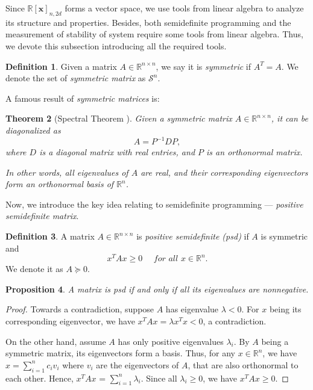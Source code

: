 \documentclass[12pt]{amsart}
\numberwithin{equation}{section}
\newtheorem{thm}{Theorem}
\newtheorem{prop}[thm]{Proposition}
\theoremstyle{definition}
\newtheorem{definition}[thm]{Definition}
\numberwithin{thm}{section}
\begin{document}
Since $\mathbb{R}[\mathbf{x}]_{n, 2d}$ forms a vector space, we use tools from linear algebra 
to analyze its structure and properties.
Besides, both semidefinite programming and the measurement of stability of system require some tools from linear algebra. 
Thus, we devote this subsection introducing all the required tools. 

\begin{definition}
     Given a matrix $A \in \mathbb{R}^{n \times n}$, we say it is \emph{symmetric} if $A^T = A$. We denote the set of \emph{symmetric matrix} as $\mathcal{S}^n$.  
\end{definition}

A famous result of \emph{symmetric matrices} is:
\begin{thm} [Spectral Theorem \cite{golub1996matrix}]

     Given a symmetric matrix $A \in \mathbb{R}^{n \times n}$, 
     it can be diagonalized as \begin{equation*} A = P^{-1}DP, \end{equation*}
     where $D$ is a diagonal matrix with real entries, and $P$ is an orthonormal matrix.
     
     In other words, all eigenvalues of $A$ are real, and their corresponding eigenvectors form an orthonormal basis of $\mathbb{R}^n$. 
\end{thm} 

\smallskip

Now, we introduce the key idea relating to semidefinite programming --- \emph{positive semidefinite matrix}.

\begin{definition}
     A matrix $A \in \mathbb{R}^{n \times n}$ is \emph{positive semidefinite (psd)} if $A$ is symmetric and \begin{equation*}
          x^T A x \geq 0 \quad \textit{ for all } x \in \mathbb{R}^n.
     \end{equation*}
     We denote it as $A \succcurlyeq 0$.
\end{definition}

\begin{prop}
     A matrix is psd if and only if all its eigenvalues are nonnegative.
\end{prop}

\begin{proof}
     Towards a contradiction, suppose $A$ has eigenvalue $\lambda < 0$.
     For $x$ being its corresponding eigenvector, we have $x^T A x = \lambda x^T x < 0$, a contradiction.
     
     On the other hand, assume $A$ has only positive eigenvalues $\lambda_i$. 
     By $A$ being a symmetric matrix, 
     its eigenvectors form a basis. 
     Thus, for any $x \in \mathbb{R}^n$, we have
     $x = \sum_{i = 1} ^ n c_i v_i $ where $v_i$ are the eigenvectors of $A$, that are also orthonormal to each other.
     Hence, $x^T A x$ = $\sum_{i = 1} ^ n \lambda_i$. Since all $\lambda_i \geq 0$, we have $x ^ T A x \geq 0$.
\end{proof}
\end{document}
